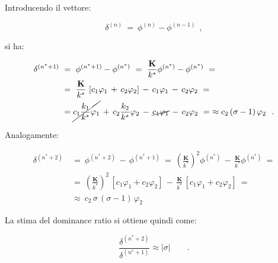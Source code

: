 Introducendo il vettore:

\[\delta^{(n)}\ =\ \phi^{(n)} - \phi^{(n-1)}\ \ ,\]

si ha:

\[\begin{aligned}
	\delta^{(n^* + 1)}\ &=\ \phi^{(n^* + 1)} - \phi^{(n^*)}\ =\ \frac{\mathbf{K}}{k^*} \phi^{(n^*)} - \phi^{(n^*)}\ =\\ 
	&=\ \frac{\mathbf{K}}{k^*}\, \left[c_1 \varphi_1 \,+\, c_2 \varphi_2\right] \,-\, c_1 \varphi_1\, -\, c_2 \varphi_2\ =\\
	&= \cancel{c_1 \frac{k_1}{k^*} \varphi_1}\, +\, c_2 \frac{k_2}{k^*} \varphi_2\, -\, \cancel{c_1 \varphi_1}\, -\, c_2 \varphi_2 \ =\ \approx c_2\, (\sigma - 1)\, \varphi_2\ \ .
\end{aligned}\]

Analogamente:

\[\begin{aligned}
	\delta^{(n^* + 2)}\ 
	&=\ \phi^{(n^* + 2)}\, -\, \phi^{(n^* + 1)}\ =\ \left(\frac{\mathbf{K}}{k^*}\right)^2 \phi^{(n^*)}\, -\, \frac{\mathbf{K}}{k^*} \phi^{(n^*)}\ =\\
	&=\ \left(\frac{\mathbf{K}}{k^*}\right)^2\,\left[c_1 \varphi_1 + c_2 \varphi_2\right]\,-\,  \frac{\mathbf{K}}{k^*}\, \left[c_1 \varphi_1 + c_2 \varphi_2\right]\ =\\
	&\approx\ c_2\, \sigma\, (\sigma - 1)\, \varphi_2 
\end{aligned}\]

La stima del dominance ratio si ottiene quindi come:

\[\boxed{\frac{\delta^{(n^* + 2)}}{\delta^{(n^* + 1)}} \approx |\sigma|}\qquad .\]